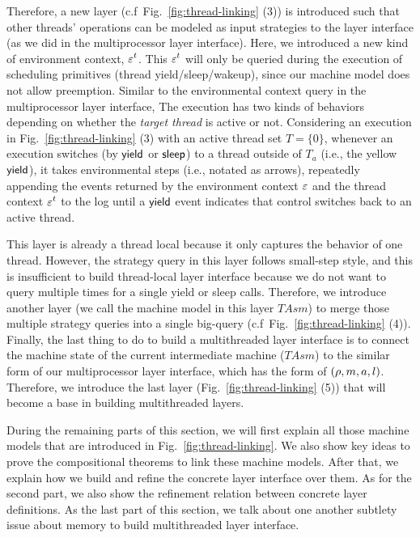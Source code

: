 Therefore,  a new layer (c.f\ Fig.~\ref{fig:thread-linking} (3)) is introduced such that other 
threads' operations can be modeled as input strategies to the layer interface 
(as we did in the multiprocessor layer interface). 
Here, we introduced a new kind of environment context, $\oracle^{t}$.
This $\oracle^t$ will only be queried during the execution of scheduling primitives (thread yield/sleep/wakeup),
since our machine model does not allow
preemption. 
Similar to the environmental context query in the multiprocessor layer interface, 
The execution has two kinds of
behaviors  depending on whether the \emph{target
thread} is active or not.
Considering an execution in Fig.~\ref{fig:thread-linking} (3) with an active thread set
$T = \{0\}$, whenever an execution switches (by $\mathsf{yield}$ or $\mathsf{sleep}$) 
to a thread outside of $T_a$ (i.e., the yellow $\mathsf{yield}$),
it takes environmental steps (i.e., notated as arrows), repeatedly appending the 
events returned by the environment context $\oracle$ and the thread
context $\oracle^t$ to the log until a $\mathsf{yield}$
event indicates that control switches back to an active thread.

This layer is already a thread local because it only captures the behavior of one thread.
However, the strategy query in this layer follows small-step style, 
and this is insufficient to build thread-local layer interface because 
we do not want to query multiple times for a single yield or sleep calls.
Therefore, we introduce another layer (we call the machine model in this layer $TAsm$)
to merge those multiple strategy queries into a single 
big-query (c.f\ Fig.~\ref{fig:thread-linking} (4)). 
Finally, the last thing to do to build a multithreaded layer interface
is to connect the machine state of the current intermediate machine ($TAsm$) 
to the similar form of 
our multiprocessor
 layer interface, which has the form of $(\rho, m, a, l)$.
Therefore, we introduce the last layer (Fig.~\ref{fig:thread-linking} (5)) that will become a 
base in building multithreaded layers.

During the remaining parts of this section, we will first explain  all those machine models 
that are introduced in Fig.~\ref{fig:thread-linking}.
We also show key ideas to prove the compositional theorems to link these machine models. 
After that, we explain how we build and refine the concrete layer interface over them. 
As for the second part, we also show the refinement relation between concrete layer definitions.
As the last part of this section, we talk about one another subtlety issue about memory to build multithreaded layer interface. 


